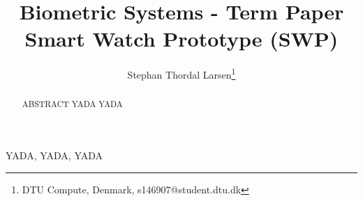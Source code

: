 \documentclass[english]{lni}
\author{Stephan Thordal Larsen\footnote{DTU Compute, Denmark,
s146907@student.dtu.dk}}
\title{Biometric Systems - Term Paper \\ Smart Watch Prototype (SWP)}
\begin{document}
\maketitle

\renewcommand{\refname}{References}
\setcounter{footnote}{1} %

\begin{abstract}
    ABSTRACT YADA YADA
\end{abstract}
\begin{keywords}
    YADA, YADA, YADA
\end{keywords}








\end{document}
